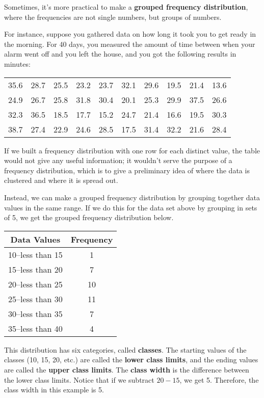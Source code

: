Sometimes, it's more practical to make a \textbf{grouped frequency distribution}, where the frequencies are not single numbers, but groups of numbers.

For instance, suppose you gathered data on how long it took you to get ready in the morning.  For 40 days, you measured the amount of time between when your alarm went off and you left the house, and you got the following results in minutes:
\begin{center}
\begin{tabular}{c c c c c c c c c c}
35.6 & 28.7 & 25.5 & 23.2 & 23.7 & 32.1 & 29.6 & 19.5 & 21.4 & 13.6\\
24.9 & 26.7 & 25.8 & 31.8 & 30.4 & 20.1 & 25.3 & 29.9 & 37.5 & 26.6\\
32.3 & 36.5 & 18.5 & 17.7 & 15.2 & 24.7 & 21.4 & 16.6 & 19.5 & 30.3\\
38.7 & 27.4 & 22.9 & 24.6 & 28.5 & 17.5 & 31.4 & 32.2 & 21.6 & 28.4\\
\end{tabular}
\end{center}

If we built a frequency distribution with one row for each distinct value, the table would not give any useful information; it wouldn't serve the purpose of a frequency distribution, which is to give a preliminary idea of where the data is clustered and where it is spread out.

Instead, we can make a grouped frequency distribution by grouping together data values in the same range.  If we do this for the data set above by grouping in sets of 5, we get the grouped frequency distribution below.
\begin{center}
\begin{tabular}{c | c}
\textbf{Data Values} & \textbf{Frequency}\\
\hline
10--less than 15 & 1\\
15--less than 20 & 7\\
20--less than 25 & 10\\
25--less than 30 & 11\\
30--less than 35 & 7\\
35--less than 40 & 4\\
\end{tabular}
\end{center}

This distribution has six categories, called \textbf{classes}.  The starting values of the classes (10, 15, 20, etc.) are called the \textbf{lower class limits}, and the ending values are called the \textbf{upper class limits}.  The \textbf{class width} is the difference between the lower class limits.  Notice that if we subtract $20-15$, we get 5.  Therefore, the class width in this example is 5.

